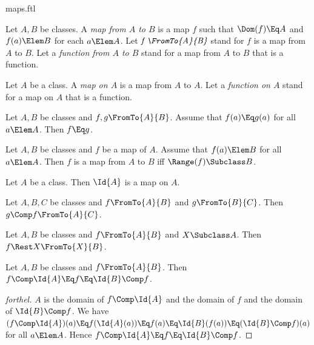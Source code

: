 \documentclass{stex}
\begin{document}
\begin{smodule}{maps.ftl}
\begin{definition*}[forthel,for={map,FromTo,function}]
  Let $A, B$ be classes.
  A \emph{map from $A$ to $B$} is a map $f$ such that $\Dom(f) \Eq A$ and $f(a) \Elem B$ for each $a \Elem A$.
  Let $\emph{f \FromTo{A}{B}}$ stand for $f$ is a map from $A$ to $B$.
  Let a \emph{function from $A$ to $B$} stand for a map from $A$ to $B$ that is a function.
\end{definition*}

\begin{definition*}[forthel,for={map,function}]
  Let $A$ be a class.
  A \emph{map on $A$} is a map from $A$ to $A$.
  Let a \emph{function on $A$} stand for a map on $A$ that is a function.
\end{definition*}

\begin{proposition*}[forthel]
  Let $A, B$ be classes and $f, g \FromTo{A}{B}$.
  Assume that $f(a) \Eq g(a)$ for all $a \Elem A$.
  Then $f \Eq g$.
\end{proposition*}

\begin{proposition*}
  Let $A, B$ be classes and $f$ be a map of $A$.
  Assume that $f(a) \Elem B$ for all $a \Elem A$.
  Then $f$ is a map from $A$ to $B$ iff $\Range(f) \Subclass B$.
\end{proposition*}

\begin{proposition*}[forthel]
  Let $A$ be a class.
  Then $\Id{A}$ is a map on $A$.
\end{proposition*}

\begin{proposition*}[forthel]
  Let $A, B, C$ be classes and $f \FromTo{A}{B}$ and $g \FromTo{B}{C}$.
  Then $g \Comp f \FromTo{A}{C}$.
\end{proposition*}

\begin{proposition*}[forthel]
  Let $A, B$ be classes and $f \FromTo{A}{B}$ and $X \Subclass A$.
  Then $f \Rest X \FromTo{X}{B}$.
\end{proposition*}

\begin{proposition*}[forthel]
  Let $A, B$ be classes and $f \FromTo{A}{B}$.
  Then $f \Comp \Id{A} \Eq f \Eq \Id{B} \Comp f$.
\end{proposition*}
\begin{proof}[forthel]
  $A$ is the domain of $f \Comp \Id{A}$ and the domain of $f$ and the domain of $\Id{B} \Comp f$.
  We have $(f \Comp \Id{A})(a)
    \Eq f(\Id{A}(a))
    \Eq f(a)
    \Eq \Id{B}(f(a))
    \Eq (\Id{B} \Comp f)(a)$
  for all $a \Elem A$.
  Hence $f \Comp \Id{A}
    \Eq f
    \Eq \Id{B} \Comp f$.
\end{proof}


\end{smodule}
\end{document}
